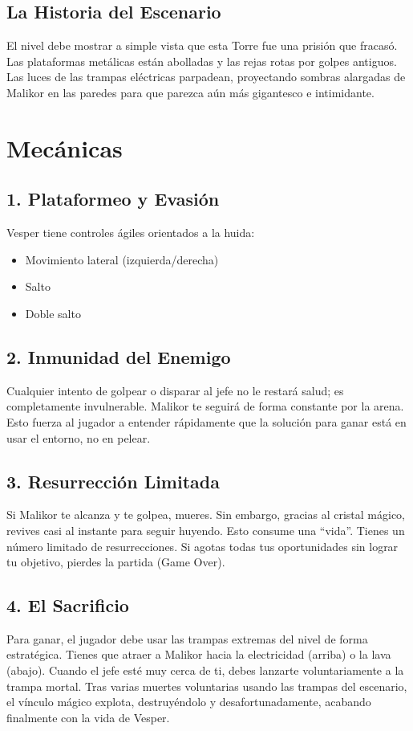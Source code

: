 \documentclass[11pt,a4paper]{article}
\begin{document}
\subsection*{La Historia del Escenario}
El nivel debe mostrar a simple vista que esta Torre fue una prisión que fracasó. Las plataformas metálicas están abolladas y las rejas rotas por golpes antiguos. Las luces de las trampas eléctricas parpadean, proyectando sombras alargadas de Malikor en las paredes para que parezca aún más gigantesco e intimidante.

\section*{Mecánicas}

\subsection*{1. Plataformeo y Evasión}
Vesper tiene controles ágiles orientados a la huida:
\begin{itemize}
    \item Movimiento lateral (izquierda/derecha)
    \item Salto
    \item Doble salto
\end{itemize}

\subsection*{2. Inmunidad del Enemigo}
Cualquier intento de golpear o disparar al jefe no le restará salud; es completamente invulnerable. Malikor te seguirá de forma constante por la arena. Esto fuerza al jugador a entender rápidamente que la solución para ganar está en usar el entorno, no en pelear.

\subsection*{3. Resurrección Limitada}
Si Malikor te alcanza y te golpea, mueres. Sin embargo, gracias al cristal mágico, revives casi al instante para seguir huyendo. Esto consume una ``vida''. Tienes un número limitado de resurrecciones. Si agotas todas tus oportunidades sin lograr tu objetivo, pierdes la partida (Game Over).

\subsection*{4. El Sacrificio}
Para ganar, el jugador debe usar las trampas extremas del nivel de forma estratégica. Tienes que atraer a Malikor hacia la electricidad (arriba) o la lava (abajo). Cuando el jefe esté muy cerca de ti, debes lanzarte voluntariamente a la trampa mortal. Tras varias muertes voluntarias usando las trampas del escenario, el vínculo mágico explota, destruyéndolo y desafortunadamente, acabando finalmente con la vida de Vesper.
\end{document}
